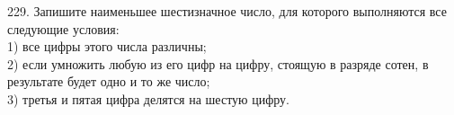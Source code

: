 229. Запишите наименьшее шестизначное число, для которого выполняются все следующие условия:\\
1) все цифры этого числа различны;\\
2) если умножить любую из его цифр на цифру, стоящую в разряде сотен, в результате будет одно и то же число;\\
3) третья и пятая цифра делятся на шестую цифру.\\
